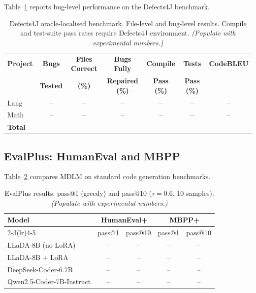 \documentclass[11pt,a4paper]{article}
\begin{document}
Table~\ref{tab:defects4j} reports bug-level performance on the Defects4J benchmark.

\begin{table}[H]
\centering
\caption{Defects4J oracle-localised benchmark. File-level and bug-level results. Compile and test-suite pass rates require Defects4J environment. \textit{(Populate with experimental numbers.)}}
\label{tab:defects4j}
\renewcommand{\arraystretch}{1.2}
\begin{tabular}{lcccccc}
\toprule
\textbf{Project} & \textbf{Bugs} & \textbf{Files Correct} & \textbf{Bugs Fully} & \textbf{Compile} & \textbf{Tests} & \textbf{CodeBLEU} \\
                 & \textbf{Tested} & \textbf{(\%)} & \textbf{Repaired (\%)} & \textbf{Pass (\%)} & \textbf{Pass (\%)} & \\
\midrule
Lang  & -- & -- & -- & -- & -- & -- \\
Math  & -- & -- & -- & -- & -- & -- \\
\midrule
\textbf{Total} & -- & -- & -- & -- & -- & -- \\
\bottomrule
\end{tabular}
\end{table}

\subsection{EvalPlus: HumanEval and MBPP}

Table~\ref{tab:evalplus} compares MDLM on standard code generation benchmarks.

\begin{table}[H]
\centering
\caption{EvalPlus results: pass@1 (greedy) and pass@10 (\(\tau=0.6\), 10 samples). \textit{(Populate with experimental numbers.)}}
\label{tab:evalplus}
\renewcommand{\arraystretch}{1.2}
\begin{tabular}{lcccc}
\toprule
\textbf{Model} & \multicolumn{2}{c}{\textbf{HumanEval+}} & \multicolumn{2}{c}{\textbf{MBPP+}} \\
\cmidrule(lr){2-3}\cmidrule(lr){4-5}
 & pass@1 & pass@10 & pass@1 & pass@10 \\
\midrule
LLaDA-8B (no LoRA)       & -- & -- & -- & -- \\
LLaDA-8B + LoRA          & -- & -- & -- & -- \\
\midrule
DeepSeek-Coder-6.7B      & -- & -- & -- & -- \\
Qwen2.5-Coder-7B-Instruct& -- & -- & -- & -- \\
\bottomrule
\end{tabular}
\end{table}
\end{document}
